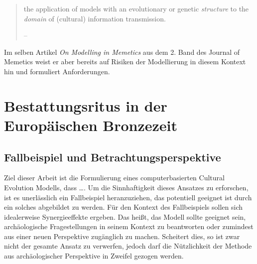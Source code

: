 \documentclass[openany,twoside,twocolumn]{book}
\let\pby\printbibliography
\renewcommand{\printbibliography}{}
\begin{document}
\begin{quote}
the application of models with an evolutionary or genetic
\emph{structure} to the \emph{domain} of (cultural) information
transmission.

-- \textcite{edmonds_modelling_1998}
\end{quote}

Im selben Artikel \emph{On Modelling in Memetics} aus dem 2. Band des
Journal of Memetics weist er aber bereits auf Risiken der Modellierung
in diesem Kontext hin und formuliert Anforderungen.

\pby[title={Literatur},segment=\therefsegment,heading=subbibintoc]

\hypertarget{bestattungsritus-in-der-europaischen-bronzezeit}{%
\chapter{Bestattungsritus in der Europäischen
Bronzezeit}\label{bestattungsritus-in-der-europaischen-bronzezeit}}

\hypertarget{fallbeispiel-und-betrachtungsperspektive}{%
\section{Fallbeispiel und
Betrachtungsperspektive}\label{fallbeispiel-und-betrachtungsperspektive}}

Ziel dieser Arbeit ist die Formulierung eines computerbasierten Cultural
Evolution Modells, dass \ldots{}. Um die Sinnhaftigkeit dieses Ansatzes
zu erforschen, ist es unerlässlich ein Fallbeispiel heranzuziehen, das
potentiell geeignet ist durch ein solches abgebildet zu werden. Für den
Kontext des Fallbeispiels sollen sich idealerweise Synergieeffekte
ergeben. Das heißt, das Modell sollte geeignet sein, archäologische
Fragestellungen in seinem Kontext zu beantworten oder zumindest aus
einer neuen Perspektive zugänglich zu machen. Scheitert dies, so ist
zwar nicht der gesamte Ansatz zu verwerfen, jedoch darf die Nützlichkeit
der Methode aus archäologischer Perspektive in Zweifel gezogen werden.
\end{document}
